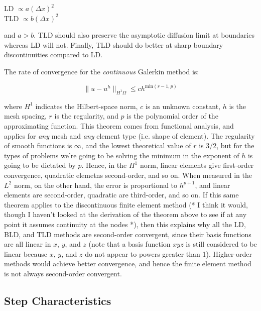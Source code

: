 \documentclass[12pt]{article}
\begin{document}
LD $\propto a(\Delta x)^2$\\
TLD $\propto b(\Delta x)^2$

and $a>b$. TLD should also preserve the asymptotic diffusion limit at boundaries whereas LD will not. Finally, TLD should do better at sharp boundary discontinuities compared to LD.

The rate of convergence for the \textit{continuous} Galerkin method is:

\begin{equation}
\|u-u^h\|_{H^1{\Omega}}\leq c h^{\text{min}(r-1, p)}
\end{equation}

where \(H^1\) indicates the Hilbert-space norm, \(c\) is an unknown constant, \(h\) is the mesh spacing, \(r\) is the regularity, and \(p\) is the polynomial order of the approximating function. This theorem comes from functional analysis, and applies for \textit{any} mesh and \textit{any} element type (i.e. shape of element). The regularity of smooth functions is \(\infty\), and the lowest theoretical value of \(r\) is 3/2, but for the types of problems we're going to be solving the minimum in the exponent of \(h\) is going to be dictated by \(p\). Hence, in the \(H^1\) norm, linear elements give first-order convergence, quadratic elemetns second-order, and so on. When measured in the \(L^2\) norm, on the other hand, the error is proportional to \(h^{p+1}\), and linear elements are second-order, quadratic are third-order, and so on. If this same theorem applies to the discontinuous finite element method (* I think it would, though I haven't looked at the derivation of the theorem above to see if at any point it assumes continuity at the nodes *), then this explains why all the LD, BLD, and TLD methods are second-order convergent, since their basis functions are all linear in \(x\), \(y\), and \(z\) (note that a basis function \(xyz\) is still considered to be linear because \(x\), \(y\), and \(z\) do not appear to powers greater than 1). Higher-order methods would achieve better convergence, and hence the finite element method is not always second-order convergent.


\subsection*{Step Characteristics}
\label{sec:step-characteristics}
\end{document}

